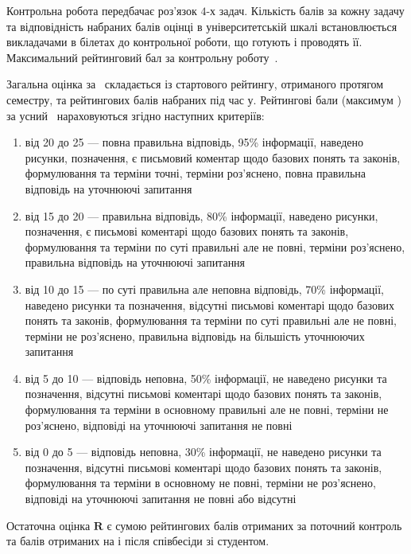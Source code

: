 \documentclass{Syllabus}
\begin{document}
Контрольна робота передбачає роз'язок $4$-х задач. Кількість балів за кожну задачу та відповідність набраних балів оцінці в університетській шкалі встановлюється викладачами в білетах до контрольної роботи, що готують і проводять її. Максимальний рейтинговий бал за контрольну роботу~\kontrolBalp.

Загальна оцінка за \control\ складається із стартового рейтингу, отриманого протягом семестру, та рейтингових балів набраних під час \control у. Рейтингові бали (максимум \kontrolBalu) за усний \control\ нараховуються згідно наступних критеріїв:
\begin{enumerate}[label=$\bullet$]
	\item від 20 до 25 --- повна правильна відповідь, 95\% інформації, наведено рисунки, позначення, є письмовий коментар щодо базових понять та законів, формулювання та терміни точні, терміни роз’яснено, повна правильна відповідь на уточнюючі запитання
	\item від 15 до 20 --- правильна відповідь, 80\% інформації, наведено рисунки, позначення, є письмові коментарі щодо базових понять та законів, формулювання та терміни по суті правильні але не повні, терміни роз’яснено, правильна відповідь на уточнюючі запитання
	\item від 10 до 15 --- по суті правильна але неповна відповідь, 70\% інформації, наведено рисунки та позначення, відсутні письмові коментарі щодо базових понять та законів, формулювання та терміни по суті правильні але не повні, терміни не роз’яснено, правильна відповідь на більшість уточнюючих запитання
	\item від 5 до 10 --- відповідь неповна, 50\% інформації, не наведено рисунки та позначення, відсутні письмові коментарі щодо базових понять та законів, формулювання та терміни в основному правильні але не повні, терміни не роз’яснено, відповіді на уточнюючі запитання не повні
	\item від 0 до 5 --- відповідь неповна, 30\% інформації, не наведено рисунки та позначення, відсутні письмові коментарі щодо базових понять та законів, формулювання та терміни в основному не повні, терміни не роз’яснено, відповіді на уточнюючі запитання не повні або відсутні
\end{enumerate}


Остаточна оцінка $\mathbf{R}$ є сумою рейтингових балів отриманих за поточний контроль та балів отриманих на \control і після співбесіди зі студентом.
\end{document}
